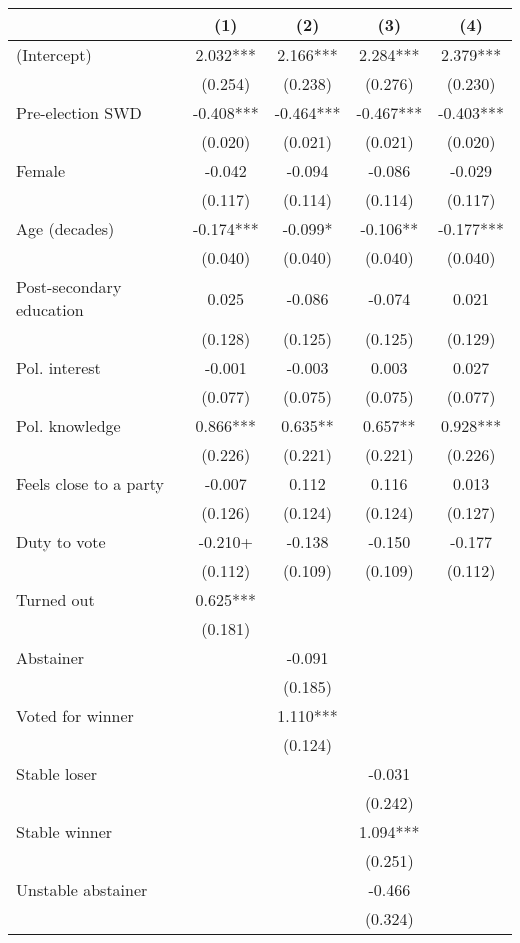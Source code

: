 \begin{table}
\centering
\begin{tabular}[t]{lcccc}
\toprule
  & (1) & (2) & (3) & (4)\\
\midrule
(Intercept) & 2.032*** & 2.166*** & 2.284*** & 2.379***\\
 & (0.254) & (0.238) & (0.276) & (0.230)\\
Pre-election SWD & -0.408*** & -0.464*** & -0.467*** & -0.403***\\
 & (0.020) & (0.021) & (0.021) & (0.020)\\
Female & -0.042 & -0.094 & -0.086 & -0.029\\
 & (0.117) & (0.114) & (0.114) & (0.117)\\
Age (decades) & -0.174*** & -0.099* & -0.106** & -0.177***\\
 & (0.040) & (0.040) & (0.040) & (0.040)\\
Post-secondary education & 0.025 & -0.086 & -0.074 & 0.021\\
 & (0.128) & (0.125) & (0.125) & (0.129)\\
Pol. interest & -0.001 & -0.003 & 0.003 & 0.027\\
 & (0.077) & (0.075) & (0.075) & (0.077)\\
Pol. knowledge & 0.866*** & 0.635** & 0.657** & 0.928***\\
 & (0.226) & (0.221) & (0.221) & (0.226)\\
Feels close to a party & -0.007 & 0.112 & 0.116 & 0.013\\
 & (0.126) & (0.124) & (0.124) & (0.127)\\
Duty to vote & -0.210+ & -0.138 & -0.150 & -0.177\\
 & (0.112) & (0.109) & (0.109) & (0.112)\\
Turned out & 0.625*** &  &  & \\
 & (0.181) &  &  & \\
Abstainer &  & -0.091 &  & \\
 &  & (0.185) &  & \\
Voted for winner &  & 1.110*** &  & \\
 &  & (0.124) &  & \\
Stable loser &  &  & -0.031 & \\
 &  &  & (0.242) & \\
Stable winner &  &  & 1.094*** & \\
 &  &  & (0.251) & \\
Unstable abstainer &  &  & -0.466 & \\
 &  &  & (0.324) & \\

\end{tabular}
\end{table}
